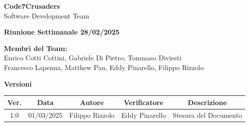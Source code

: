 \documentclass{article}
\begin{document}
\begin{titlepage}
    {\Huge \textbf{Code7Crusaders}}\\
    \vspace{0.5cm}
    {\Large Software Development Team}\\
    \vspace{2cm}
        
        {\large \textbf{Riunione Settimanale 28/02/2025}}\\
    \vspace{5cm}                           %
    
    
    \textbf{Membri del Team:}\\
    Enrico Cotti Cottini, Gabriele Di Pietro, Tommaso Diviesti \\
    Francesco Lapenna, Matthew Pan, Eddy Pinarello, Filippo Rizzolo \\
    \vspace{0.5cm}
    
    \vspace{1cm}
\end{titlepage}



\newpage
\begin{table}[h!]
\centering
\textbf{Versioni} \\ %
\vspace{2mm} %
\begin{tabular}{|c|c|c|c|c|}
    \hline
    \textbf{Ver.} & \textbf{Data} & \textbf{Autore} & \textbf{Verificatore} & \textbf{Descrizione} \\
    \hline
    1.0 & 01/03/2025 & Filippo Rizzolo & Eddy Pinarello & Stesura del Documento \\ 
    \hline                                  %
\end{tabular}
\end{table}



\newpage
\end{document}
